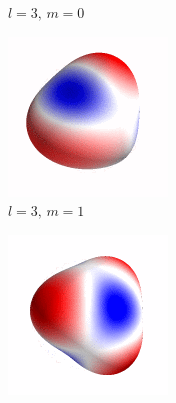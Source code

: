 \begin{figure}[ht]
\begin{subfigure}[b]{0.2\linewidth}
        \caption*{$l=3,\,m=0$}
    \end{subfigure}%
    \begin{subfigure}[b]{0.2\linewidth}
        \includegraphics[width=\linewidth]{introduction/images/3_1.png}
        \caption*{$l=3,\,m=1$}
    \end{subfigure}%
    \begin{subfigure}[b]{0.2\linewidth}
        \includegraphics[width=\linewidth]{introduction/images/3_2.png}

\end{subfigure}
\end{figure}
